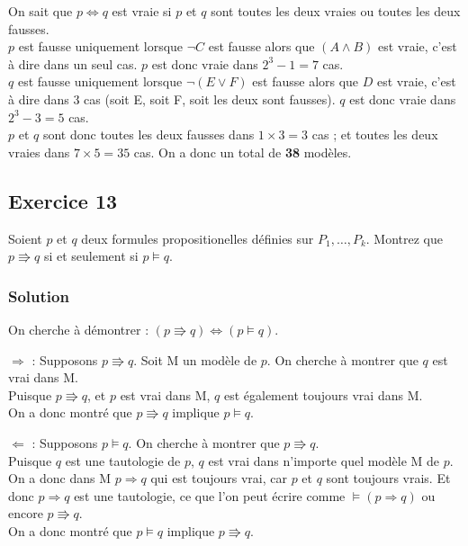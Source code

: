     On sait que $p \Leftrightarrow q$ est vraie si $p$ et $q$ sont toutes les deux vraies ou toutes les deux fausses.\\
    $p$ est fausse uniquement lorsque $\neg C$ est fausse alors que $(A \land B)$ est vraie, c'est à dire dans un seul cas.
    $p$ est donc vraie dans $2^3-1=7$ cas.\\
    $q$ est fausse uniquement lorsque $\neg(E \lor F)$ est fausse alors que $D$ est vraie, c'est à dire dans 3 cas (soit E, soit F, soit les deux sont fausses).
    $q$ est donc vraie dans $2^3-3=5$ cas.\\
    $p$ et $q$ sont donc toutes les deux fausses dans $1 \times 3 = 3$ cas ; et toutes les deux vraies dans $7 \times 5 = 35$ cas.
    On a donc un total de \textbf{38} modèles.

\subsection*{Exercice 13}
Soient $p$ et $q$ deux formules propositionelles définies sur $P_1, \ldots, P_k$.
Montrez que $p \Rrightarrow q$ si et seulement si $p \models q$. 


\subsubsection*{Solution}

    \noindent On cherche à démontrer : $(p \Rrightarrow q) \Leftrightarrow (p \models q)$.
   
    \noindent $\Rightarrow$ :
    Supposons $p \Rrightarrow q$.
    Soit M un modèle de $p$.
    On cherche à montrer que $q$ est vrai dans M.\\
    Puisque $p \Rrightarrow q$, et $p$ est vrai dans M, $q$ est également toujours vrai dans M.\\
    On a donc montré que $p \Rrightarrow q$ implique $p \models q$.
    
    \noindent $\Leftarrow$ :
    Supposons $p \models q$.
    On cherche à montrer que $p \Rrightarrow q$.\\
    Puisque $q$ est une tautologie de $p$, $q$ est vrai dans n'importe quel modèle M de $p$.
    On a donc dans M $p \Rightarrow q$ qui est toujours vrai, car $p$ et $q$ sont toujours vrais.
    Et donc $p \Rightarrow q$ est une tautologie, ce que l'on peut écrire comme $\models (p \Rightarrow q)$ ou encore $p \Rrightarrow q$.\\
    On a donc montré que $p \models q$ implique $p \Rrightarrow q$.
    
